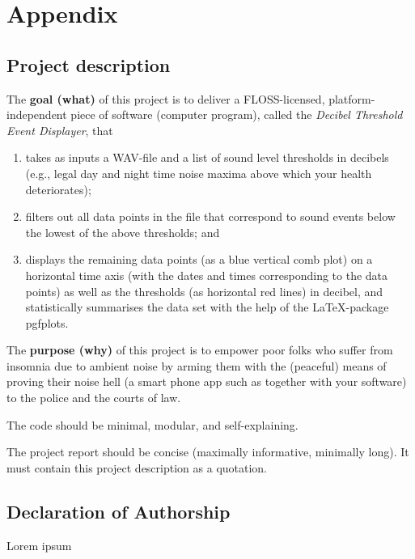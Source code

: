 \section{Appendix}

\subsection{Project description}

The \textbf{goal (what)} of this project is to deliver a FLOSS-licensed, platform-independent piece of
software (computer program), called the \textit{Decibel Threshold Event Displayer}, that

\begin{enumerate}
    \item takes as inputs a WAV-file and a list of sound level thresholds in decibels (e.g., legal day
    and night time noise maxima above which your health deteriorates);
    \item filters out all data points in the file that correspond to sound events below the lowest of
    the above thresholds; and
    \item displays the remaining data points (as a blue vertical comb plot) on a horizontal time
    axis (with the dates and times corresponding to the data points) as well as the
    thresholds (as horizontal red lines) in decibel, and statistically summarises the data set
    with the help of the LaTeX-package pgfplots.
\end{enumerate}

The \textbf{purpose (why)} of this project is to empower poor folks who suffer from insomnia due to
ambient noise by arming them with the (peaceful) means of proving
their noise hell (a smart phone app such as together with your software) to the police and the courts of
law. \newline

The code should be minimal, modular, and self-explaining. \newline

The project report should be concise (maximally informative, minimally long). It must contain
this project description as a quotation.

\subsection{Declaration of Authorship}
Lorem ipsum